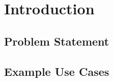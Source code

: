 \chapter{Introduction}\label{ch:introduction}

\section{Problem Statement}\label{sec:problem-statement}



\section{Example Use Cases}\label{sec:example-use-cases}

